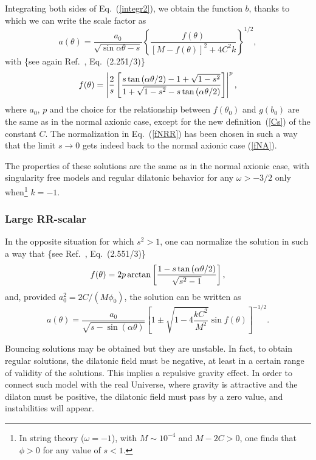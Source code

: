 \documentclass[a4paper,aps,twocolumn,prd,showpacs,nofootinbib]{revtex4}
\begin{document}
Integrating both sides of Eq.~(\ref{integr2}), we obtain the function
$b$, thanks to which we can write the scale factor as
\begin{equation}
a(\theta) = \frac{a_0}{\sqrt{\sin\alpha\theta -
s}}\left\{\frac{f(\theta)} {\left[ M - f(\theta)\right]^2 + 4C^2k }
\right\}^{1/2},
\end{equation}
with \{see again Ref.~\cite{Grad}, Eq.~(2.251/3)\}
\begin{equation}
f(\theta) = \left| {2\over s}
\left[\frac{s\tan\left(\alpha\theta/2\right) - 1 + \sqrt{1 - s^2}}{1 +
\sqrt{1 -s^2}- s\tan\left(\alpha\theta/2\right)}\right]\right|^p,
\label{fNRR}
\end{equation}
where $a_0$, $p$ and the choice for the relationship between
$f(\theta_0)$ and $g(b_0)$ are the same as in the normal axionic case,
except for the new definition~(\ref{Cs}) of the constant $C$. The
normalization in Eq.~(\ref{fNRR}) has been chosen in such a way that
the limit $s\to 0$ gets indeed back to the normal axionic case
(\ref{fNA}).

The properties of these solutions are the same as in the normal
axionic case, with singularity free models and regular dilatonic
behavior for any $\omega >-3/2$ only when\footnote{In string theory
($\omega=-1$), with $M\sim 10^{-4}$ and $M-2C>0$, one finds that $\phi
> 0$ for any value of $s<1$.}  $k = -1$.

\subsubsection{Large RR-scalar}

In the opposite situation for which $s^2 >1$, one can normalize the
solution in such a way that \{see Ref.~\cite{Grad}, Eq.~(2.551/3)\}
\begin{equation}
f(\theta) = 2 p \arctan \left[
{1-s\tan\left(\alpha\theta/2\right)\over \sqrt{s^2-1} }\right],
\end{equation}
and, provided $a_0^2 = 2 C/(M\phi_0)$, the solution can be written as
\begin{equation}
a(\theta) = \frac{a_0}{\sqrt{s - \sin(\alpha\theta)}}\left[1 \pm
\sqrt{1 - 4\displaystyle{\frac{kC^2}{M^2}}}\sin
f(\theta)\right]^{-1/2} \!\!\!\!\!\!\!\!\!\!.
\end{equation}

Bouncing solutions may be obtained but they are unstable. In fact, to
obtain regular solutions, the dilatonic field must be negative, at
least in a certain range of validity of the solutions. This implies a
repulsive gravity effect. In order to connect such model with the real
Universe, where gravity is attractive and the dilaton must be
positive, the dilatonic field must pass by a zero value, and
instabilities will appear.
\end{document}
